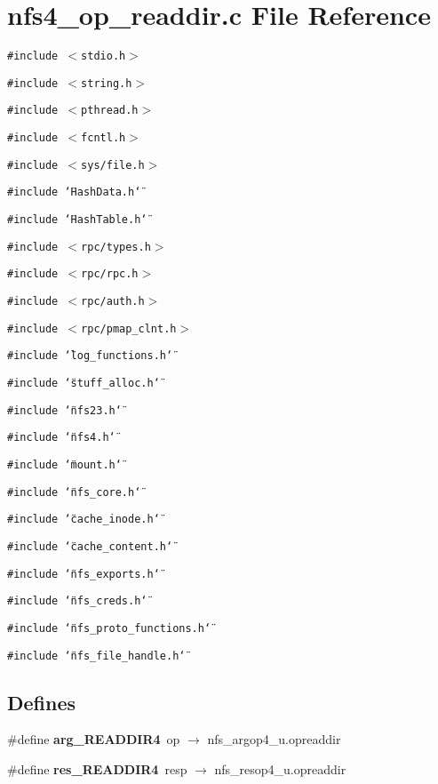 \section{nfs4\_\-op\_\-readdir.c File Reference}
\label{nfs4__op__readdir_8c}
{\tt \#include $<$stdio.h$>$}\par
{\tt \#include $<$string.h$>$}\par
{\tt \#include $<$pthread.h$>$}\par
{\tt \#include $<$fcntl.h$>$}\par
{\tt \#include $<$sys/file.h$>$}\par
{\tt \#include \char`\"{}Hash\-Data.h\char`\"{}}\par
{\tt \#include \char`\"{}Hash\-Table.h\char`\"{}}\par
{\tt \#include $<$rpc/types.h$>$}\par
{\tt \#include $<$rpc/rpc.h$>$}\par
{\tt \#include $<$rpc/auth.h$>$}\par
{\tt \#include $<$rpc/pmap\_\-clnt.h$>$}\par
{\tt \#include \char`\"{}log\_\-functions.h\char`\"{}}\par
{\tt \#include \char`\"{}stuff\_\-alloc.h\char`\"{}}\par
{\tt \#include \char`\"{}nfs23.h\char`\"{}}\par
{\tt \#include \char`\"{}nfs4.h\char`\"{}}\par
{\tt \#include \char`\"{}mount.h\char`\"{}}\par
{\tt \#include \char`\"{}nfs\_\-core.h\char`\"{}}\par
{\tt \#include \char`\"{}cache\_\-inode.h\char`\"{}}\par
{\tt \#include \char`\"{}cache\_\-content.h\char`\"{}}\par
{\tt \#include \char`\"{}nfs\_\-exports.h\char`\"{}}\par
{\tt \#include \char`\"{}nfs\_\-creds.h\char`\"{}}\par
{\tt \#include \char`\"{}nfs\_\-proto\_\-functions.h\char`\"{}}\par
{\tt \#include \char`\"{}nfs\_\-file\_\-handle.h\char`\"{}}\par
\subsection*{Defines}
\begin{CompactItemize}
\item 
\#define {\bf arg\_\-READDIR4}\ op $\rightarrow$ nfs\_\-argop4\_\-u.opreaddir
\item 
\#define {\bf res\_\-READDIR4}\ resp $\rightarrow$ nfs\_\-resop4\_\-u.opreaddir
\end{CompactItemize}
